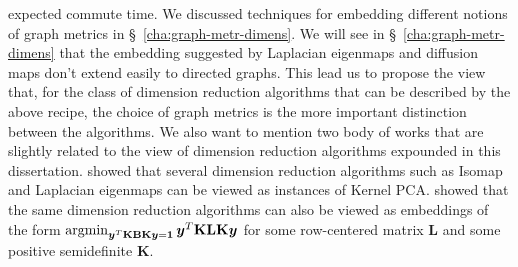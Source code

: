 expected commute time. We discussed techniques for embedding different
notions of graph metrics in \S~\ref{cha:graph-metr-dimens}. We will
see in \S~\ref{cha:graph-metr-dimens} that the embedding suggested by
Laplacian eigenmaps and diffusion maps don't extend easily to directed
graphs. This lead us to propose the view that, for the class of
dimension reduction algorithms that can be described by the above
recipe, the choice of graph metrics is the more important distinction
between the algorithms. We also want to mention two body of works that
are slightly related to the view of dimension reduction algorithms
expounded in this dissertation. \citet{ham04} showed that several
dimension reduction algorithms such as Isomap and Laplacian eigenmaps
can be viewed as instances of Kernel
PCA. \citet{yan07:_graph_embed_exten} showed that the same dimension
reduction algorithms can also be viewed as embeddings of the form
$\argmin_{\bm{y}^{T} \mathbf{K}\mathbf{B} \mathbf{K} \bm{y} = \bm{1}}
\bm{y}^{T} \mathbf{K} \mathbf{L} \mathbf{K} \bm{y}$ for some
row-centered matrix $\mathbf{L}$ and some positive semidefinite
$\mathbf{K}$.
%  
%
%
%

